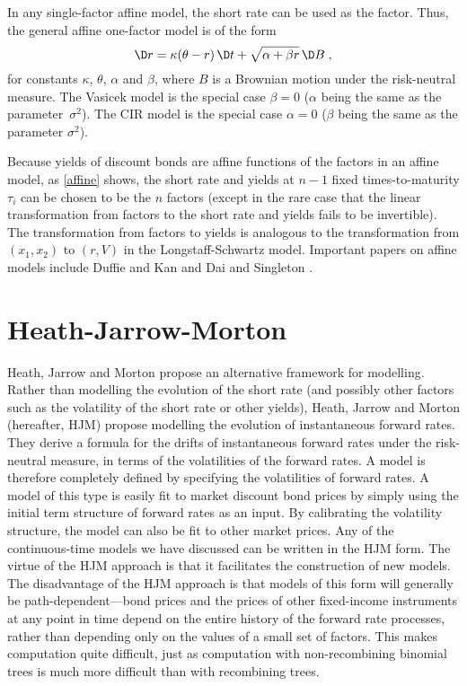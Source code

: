 In any single-factor affine model, the short rate can be used as the factor.  Thus, the general affine one-factor model is of the form
$$\D r = \kappa(\theta-r)\,\D t + \sqrt{\alpha + \beta r}\,\D B\; ,$$
for constants $\kappa$, $\theta$, $\alpha$ and $\beta$, where $B$ is a Brownian motion under the risk-neutral measure.  The Vasicek model is the special case  $\beta = 0$ ($\alpha$ being the same as the parameter~$\sigma^2$).  The CIR model is the special case $\alpha = 0$ ($\beta$ being the same as the parameter $\sigma^2$).

Because yields of discount bonds are affine functions of the factors in an affine model, as  \eqref{affine} shows, the short rate and yields at $n-1$ fixed times-to-maturity $\tau_i$ can be chosen to be the $n$ factors (except in the rare case that the linear transformation from factors to the short rate and yields fails to be invertible).  The transformation from factors to yields is analogous to the transformation from $(x_1,x_2)$ to $(r,V)$ in the Longstaff-Schwartz model.  Important papers on affine models include Duffie and Kan \cite{DK} and Dai and Singleton \cite{DSing}.



\section{Heath-Jarrow-Morton}\label{s_hjm}

Heath, Jarrow and Morton \cite{HJM} propose an alternative framework for modelling.  Rather than modelling the evolution of the short rate (and possibly other factors such as the volatility of the short rate or other yields), Heath, Jarrow and Morton (hereafter, HJM) propose modelling the evolution of instantaneous forward rates.  They derive a formula for the drifts of instantaneous forward rates under the risk-neutral measure, in terms of the volatilities of the forward rates.  A model is therefore completely defined by specifying the volatilities of forward rates.  A model of this type is easily fit to market discount bond prices by simply using the initial term structure of forward rates as an input.  By calibrating the volatility structure, the model can also be fit to other market prices.  Any of the continuous-time models we have discussed can be written in the HJM  form.  The virtue of the HJM approach is that it facilitates the construction of new models.  The disadvantage of the HJM approach is that models of this form will generally be path-dependent---bond prices and the prices of other fixed-income instruments at any point in time depend on the entire history of the forward rate processes, rather than depending only on the values of a small set of factors.  This makes computation quite difficult, just as computation with non-recombining binomial trees is much more difficult than with recombining trees.

